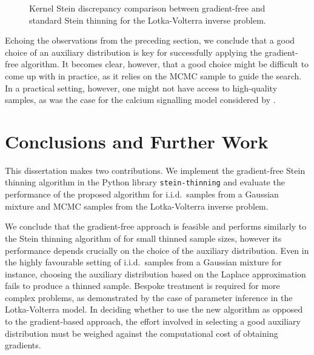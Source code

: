 \documentclass[11pt,a4paper]{report}
\begin{document}
\begin{figure}[h]
\centering
{}
\caption{Kernel Stein discrepancy comparison between gradient-free and standard Stein thinning for the Lotka-Volterra inverse problem.
\label{fig:lotka-volterra:gf-thinning:ksd}}
\end{figure}

Echoing the observations from the preceding section, we conclude that a good choice of an auxiliary distribution is key for successfully applying the gradient-free algorithm. It becomes clear, however, that a good choice might be difficult to come up with in practice, as it relies on the MCMC sample to guide the search. In a practical setting, however, one might not have access to high-quality samples, as was the case for the calcium signalling model considered by \cite{riabizOptimalThinningMCMC2022}.

\chapter{Conclusions and Further Work}
\label{ch:conclusions}

This dissertation makes two contributions. We implement the gradient-free Stein thinning algorithm in the Python library \texttt{stein-thinning} and evaluate the performance of the proposed algorithm for i.i.d.\ samples from a Gaussian mixture and MCMC samples from the Lotka-Volterra inverse problem.

We conclude that the gradient-free approach is feasible and performs similarly to the Stein thinning algorithm of \cite{riabizOptimalThinningMCMC2022} for small thinned sample sizes, however its performance depends crucially on the choice of the auxiliary distribution. Even in the highly favourable setting of i.i.d.\ samples from a Gaussian mixture for instance, choosing the auxiliary distribution based on the Laplace approximation fails to produce a thinned sample. Bespoke treatment is required for more complex problems, as demonstrated by the case of parameter inference in the Lotka-Volterra model. In deciding whether to use the new algorithm as opposed to the gradient-based approach, the effort involved in selecting a good auxiliary distribution must be weighed against the computational cost of obtaining gradients.
\end{document}

